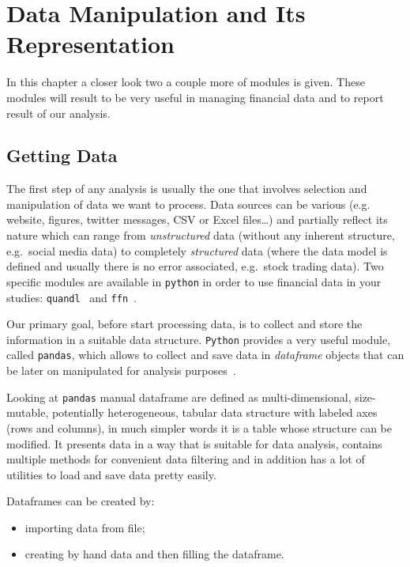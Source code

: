\chapter{Data Manipulation and Its Representation}

In this chapter a closer look two a couple more of modules is given. These modules will result to be very useful in managing financial data and to report result of our analysis.

\section{Getting Data}\label{getting-data}

The first step of any analysis is usually the one that involves selection and manipulation of data we want to process. Data sources can be various (e.g. website, figures, twitter messages, CSV or Excel files\ldots{}) and partially reflect its nature which can range from \emph{unstructured} data (without any inherent structure, e.g.~social media data) to completely \emph{structured} data (where the data model is defined and usually there is no error associated, e.g.~stock trading data).
Two specific modules are available in \texttt{python} in order to use financial data in your studies: \texttt{quandl}~\cite{quandl} and \texttt{ffn}~\cite{ffn}.

Our primary goal, before start processing data, is to collect and store the information in a suitable data structure. \texttt{Python} provides a very useful module, called \texttt{pandas}, which allows to collect and save data in \emph{dataframe} objects that can be later on manipulated for analysis purposes~\cite{pandas}.

Looking at \texttt{pandas} manual dataframe are defined as multi-dimensional, size-mutable, potentially heterogeneous, tabular data structure with labeled axes (rows and columns), in much simpler words it is a table whose structure can be modified.
It presents data in a way that is suitable for data analysis, contains multiple methods for convenient data filtering and in addition has a lot of utilities to load and save data pretty easily.

Dataframes can be created by:
\begin{itemize}
\item importing data from file;
\item creating by hand data and then filling the dataframe.
\end{itemize}

